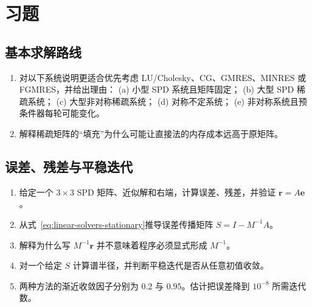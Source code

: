 \section*{习题}

\subsection*{基本求解路线}
\begin{enumerate}[label=\arabic*.]
\item 对以下系统说明更适合优先考虑 LU/Cholesky、CG、GMRES、MINRES 或 FGMRES，并给出理由：
  (a) 小型 SPD 系统且矩阵固定；
  (b) 大型 SPD 稀疏系统；
  (c) 大型非对称稀疏系统；
  (d) 对称不定系统；
  (e) 非对称系统且预条件器每轮可能变化。
\item 解释稀疏矩阵的“填充”为什么可能让直接法的内存成本远高于原矩阵。
\end{enumerate}

\subsection*{误差、残差与平稳迭代}
\begin{enumerate}[label=\arabic*.]
\item 给定一个 $3\times3$ SPD 矩阵、近似解和右端，计算误差、残差，并验证 $\bm r=A\bm e$。
\item 从式~\eqref{eq:linear-solvers-stationary}推导误差传播矩阵 $S=I-M^{-1}A$。
\item 解释为什么写 $M^{-1}\bm r$ 并不意味着程序必须显式形成 $M^{-1}$。
\item 对一个给定 $S$ 计算谱半径，并判断平稳迭代是否从任意初值收敛。
\item 两种方法的渐近收敛因子分别为 $0.2$ 与 $0.95$。估计把误差降到 $10^{-8}$ 所需迭代数。
\end{enumerate}


